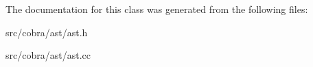 The documentation for this class was generated from the following files\+:\begin{DoxyCompactItemize}
\item 
src/cobra/ast/ast.\+h\item 
src/cobra/ast/ast.\+cc\end{DoxyCompactItemize}
